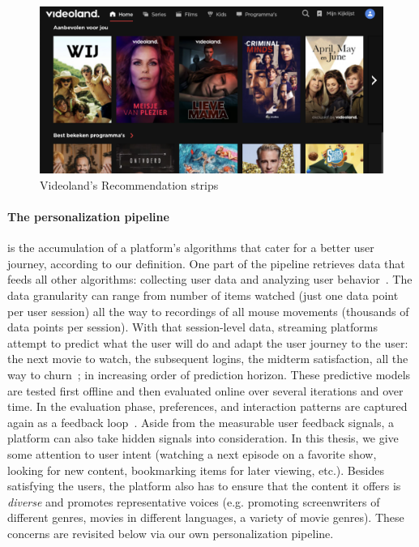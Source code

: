 \begin{figure}[h]
  \centering
  \includegraphics[width=\textwidth]{images/VLHome_cropped.png}
  \caption{Videoland's Recommendation strips}
  \label{fig:VLStrip}
\end{figure}

\paragraph{The personalization pipeline} is the accumulation of a platform's algorithms that cater for a better user journey, according to our definition. One part of the pipeline retrieves data that feeds all other algorithms: collecting user data and analyzing user behavior~\cite{behaviorals}.
The data granularity can range from number of items watched (just one data point per user session) all the way to recordings of all mouse movements (thousands of data points per session). With that session-level data, streaming platforms attempt to predict what the user will do and adapt the user journey to the user: the next movie to watch, the subsequent logins, the midterm satisfaction, all the way to churn~\cite{longTerm}; in increasing order of prediction horizon. These predictive models are tested first offline and then evaluated online over several iterations and over time. In the evaluation phase, preferences, and interaction patterns are captured again as a feedback loop~\cite{offlineOnlineSurvey, NetflixReco}. Aside from the measurable user feedback signals, a platform can also take hidden signals into consideration. In this thesis, we give some attention to user intent (watching a next episode on a favorite show, looking for new content, bookmarking items for later viewing, etc.). Besides satisfying the users, the platform also has to ensure that the content it offers is \emph{diverse} and promotes representative voices (e.g. promoting screenwriters of different genres, movies in different languages, a variety of movie genres). These concerns are revisited below via our own personalization pipeline.


